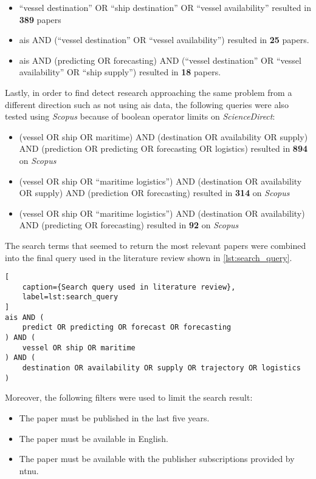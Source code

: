 \begin{itemize}
    \item ``vessel destination'' OR ``ship destination'' OR ``vessel availability'' resulted in \textbf{389} papers
    \item ais AND (``vessel destination'' OR ``vessel availability'') resulted in \textbf{25} papers.
    \item ais AND (predicting OR forecasting) AND (``vessel destination'' OR ``vessel availability'' OR ``ship supply'') resulted in \textbf{18} papers.
\end{itemize}

Lastly, in order to find detect research approaching the same problem from a different direction such as not using \acrshort{ais} data, the following queries were also tested using \textit{Scopus} because of boolean operator limits on \textit{ScienceDirect}:

\begin{itemize}
    \item (vessel OR ship OR maritime) AND (destination OR availability OR supply) AND (prediction OR predicting OR forecasting OR logistics) resulted in \textbf{894} on \textit{Scopus}
    \item (vessel OR ship OR ``maritime logistics'') AND (destination OR availability OR supply) AND (prediction OR forecasting) resulted in \textbf{314} on \textit{Scopus}
    \item (vessel OR ship OR ``maritime logistics'') AND (destination OR availability) AND (predicting OR forecasting) resulted in \textbf{92} on \textit{Scopus}
\end{itemize}

The search terms that seemed to return the most relevant papers were combined into the final query used in the literature review shown in \cref{lst:search_query}.

\begin{lstlisting}[
    caption={Search query used in literature review},
    label=lst:search_query
]
ais AND (
    predict OR predicting OR forecast OR forecasting
) AND (
    vessel OR ship OR maritime
) AND (
    destination OR availability OR supply OR trajectory OR logistics
)
\end{lstlisting}

Moreover, the following filters were used to limit the search result:

\begin{itemize}
    \item The paper must be published in the last five years.
    \item The paper must be available in English.
    \item The paper must be available with the publisher subscriptions provided by \acrshort{ntnu}.
\end{itemize}

